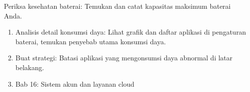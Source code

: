 \begin{tcbpractice}{Periksa kesehatan baterai: Temukan dan catat kapasitas maksimum baterai Anda.}
\begin{enumerate}
  \item Analisis detail konsumsi daya: Lihat grafik dan daftar aplikasi di pengaturan baterai, temukan penyebab utama konsumsi daya.
  \item Buat strategi: Batasi aplikasi yang mengonsumsi daya abnormal di latar belakang.
  \item Bab 16: Sistem akun dan layanan cloud
\end{enumerate}

\end{tcbpractice}
